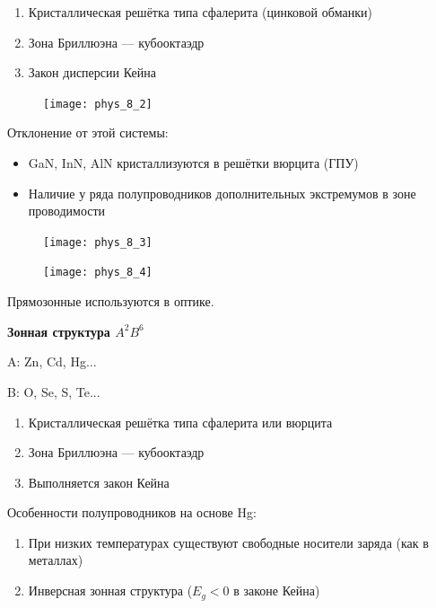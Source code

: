 \begin{enumerate}
    \item Кристаллическая решётка типа сфалерита (цинковой обманки)
    \item Зона Бриллюэна --- кубооктаэдр
    \item Закон дисперсии Кейна
\end{enumerate}

\begin{figure}[h!]
    \centering
    \texttt{[image: phys\_8\_2]}
\end{figure}

Отклонение от этой системы:

\begin{itemize}
    \item GaN, InN, AlN кристаллизуются в решётки вюрцита (ГПУ)
    \item Наличие у ряда полупроводников дополнительных экстремумов в зоне проводимости
\end{itemize}

\begin{figure}[h!]
    \centering
    \texttt{[image: phys\_8\_3]}
\end{figure}

\begin{figure}[h!]
    \centering
    \texttt{[image: phys\_8\_4]}
\end{figure}

Прямозонные используются в оптике.


\textbf{Зонная структура $A^2B^6$}

A: Zn, Cd, Hg...

B: O, Se, S, Te...

\begin{enumerate}
    \item Кристаллическая решётка типа сфалерита или вюрцита
    \item Зона Бриллюэна --- кубооктаэдр
    \item Выполняется закон Кейна
\end{enumerate}

Особенности полупроводников на основе Hg:

\begin{enumerate}
    \item При низких температурах существуют свободные носители заряда (как в металлах)
    \item Инверсная зонная структура ($E_g<0$ в законе Кейна)
\end{enumerate}

